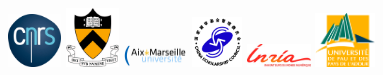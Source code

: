 \documentclass[oneside,english,onecolumn,letterpaper]{book}
\begin{document}
\begin{figure}[htbp]
\noindent \begin{centering}
\includegraphics[width=0.125\textwidth]{figures/logo_cnrs}\vspace*{2truemm}
\includegraphics[width=0.125\textwidth]{figures/logo_princeton}\vspace*{2truemm}
\includegraphics[width=0.15\textwidth]{figures/logo_aix_marseille_universite}\vspace*{0.02truemm}
\includegraphics[width=0.12\textwidth]{figures/logo_CSC_China}\vspace*{0.02truemm}
\includegraphics[width=0.15\textwidth]{figures/logo_inria}\vspace*{2truemm}
\includegraphics[width=0.14\textwidth]{figures/logo_UPPA}
\par\end{centering}


\end{figure}
\end{document}
